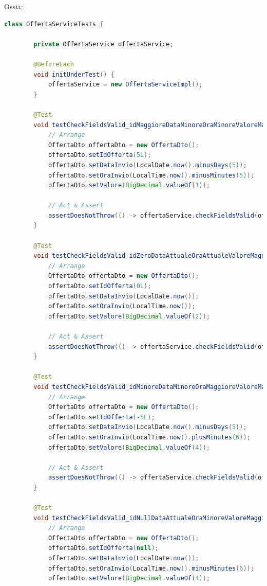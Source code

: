             Ossia:

            \begin{lstlisting}[language=Java, caption=OffertaServiceTests.java]
    class OffertaServiceTests {

        private OffertaService offertaService;
    
        @BeforeEach
        void initUnderTest() {
            offertaService = new OffertaServiceImpl();
        }
    
        @Test
        void testCheckFieldsValid_idMaggioreDataMinoreOraMinoreValoreMaggiore() {
            // Arrange
            OffertaDto offertaDto = new OffertaDto();
            offertaDto.setIdOfferta(5L);
            offertaDto.setDataInvio(LocalDate.now().minusDays(5));
            offertaDto.setOraInvio(LocalTime.now().minusMinutes(5));
            offertaDto.setValore(BigDecimal.valueOf(1));
    
            // Act & Assert
            assertDoesNotThrow(() -> offertaService.checkFieldsValid(offertaDto));
        }
    
        @Test
        void testCheckFieldsValid_idZeroDataAttualeOraAttualeValoreMaggiore() {
            // Arrange
            OffertaDto offertaDto = new OffertaDto();
            offertaDto.setIdOfferta(0L);
            offertaDto.setDataInvio(LocalDate.now());
            offertaDto.setOraInvio(LocalTime.now());
            offertaDto.setValore(BigDecimal.valueOf(2));
    
            // Act & Assert
            assertDoesNotThrow(() -> offertaService.checkFieldsValid(offertaDto));
        }
    
        @Test
        void testCheckFieldsValid_idMinoreDataMinoreOraMaggioreValoreMaggiore() {
            // Arrange
            OffertaDto offertaDto = new OffertaDto();
            offertaDto.setIdOfferta(-5L);
            offertaDto.setDataInvio(LocalDate.now().minusDays(5));
            offertaDto.setOraInvio(LocalTime.now().plusMinutes(6));
            offertaDto.setValore(BigDecimal.valueOf(4));
    
            // Act & Assert
            assertDoesNotThrow(() -> offertaService.checkFieldsValid(offertaDto));
        }
    
        @Test
        void testCheckFieldsValid_idNullDataAttualeOraMinoreValoreMaggiore() {
            // Arrange
            OffertaDto offertaDto = new OffertaDto();
            offertaDto.setIdOfferta(null);
            offertaDto.setDataInvio(LocalDate.now());
            offertaDto.setOraInvio(LocalTime.now().minusMinutes(6));
            offertaDto.setValore(BigDecimal.valueOf(4));
    

\end{lstlisting}
